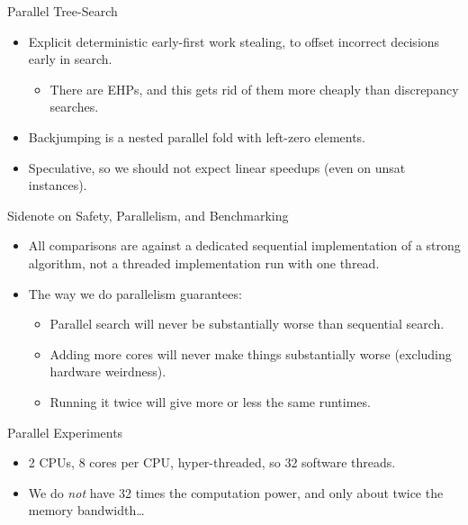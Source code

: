 \documentclass{beamer}
\begin{document}
\begin{frame}{Parallel Tree-Search}
     {
        \begin{itemize}
            \item Explicit \textcolor{uofgrose}{deterministic early-first work stealing}, to offset
                incorrect decisions early in search.
                \begin{itemize}
                    \item There are EHPs, and this gets rid of them more cheaply than discrepancy
                        searches.
                \end{itemize}
            \item Backjumping is a nested parallel fold with left-zero elements.
            \item Speculative, so we should \textcolor{uofgrose}{not expect linear speedups} (even
                on unsat instances).
        \end{itemize}
    }
\end{frame}

\begin{frame}{Sidenote on Safety, Parallelism, and Benchmarking}
    \begin{itemize}
        \item All comparisons are against a dedicated sequential implementation of a strong
            algorithm, not a threaded implementation run with one thread.
        \item The way we do parallelism guarantees:
            \begin{itemize}
                \item Parallel search will \textcolor{uofgrose}{never be substantially worse} than
                    sequential search.
                \item Adding more cores will never make things substantially worse (excluding
                    hardware weirdness).
                \item Running it twice will give more or less the same runtimes.
            \end{itemize}
    \end{itemize}
\end{frame}

\begin{frame}{Parallel Experiments}
    \begin{itemize}
        \item 2 CPUs, 8 cores per CPU, hyper-threaded, so 32 software threads.
        \item We do \emph{not} have 32 times the computation power, and only about twice the memory
            bandwidth\ldots
    \end{itemize}
\end{frame}
\end{document}

